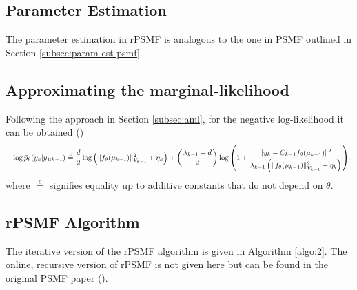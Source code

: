 \documentclass{mldsmsc}
\begin{document}
\subsection{Parameter Estimation}

The parameter estimation in rPSMF is analogous to the one in PSMF outlined in Section \ref{subsec:param-est-psmf}.

\subsection{Approximating the marginal-likelihood}

Following the approach in Section \ref{subsec:aml}, for the negative log-likelihood it can be obtained (\cite{akyildiz2021probabilistic})
\begin{equation}
    -\log \Tilde{p}_{\theta}(y_k | y_{1:k-1}) \overset{c}{=} \frac{d}{2} \log \left(\Vert f_{\theta}(\mu_{k-1}) \Vert_{V_{k-1}}^2 + \eta_k\right) + \left(\frac{\lambda_{k-1} + d}{2}\right) \log \left(1 + \frac{\Vert y_k - C_{k-1} f_{\theta}(\mu_{k-1}) \Vert^2}{\lambda_{k-1}\left(\Vert f_{\theta}(\mu_{k-1}) \Vert^2_{V_{k-1}} + \eta_k\right)}\right),
\end{equation}
where $\overset{c}{=}$ signifies equality up to additive constants that do not depend on $\theta$.

\subsection{rPSMF Algorithm}

The iterative version of the rPSMF algorithm is given in Algorithm \ref{algo:2}. The online, recursive version of rPSMF is not given here but can be found in the original PSMF paper (\cite{akyildiz2021probabilistic}).
\end{document}
